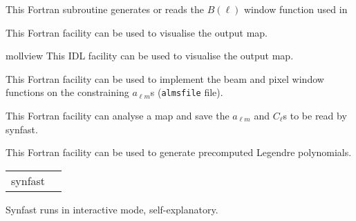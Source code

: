 \begin{support}
  \begin{sulist}{} %
  \item[\htmlref{generate\_beam}{sub:generate_beam}] This \healpix Fortran
subroutine generates or reads the $B(\ell)$ window function used in \thedocid
  \item[\htmlref{map2gif}{fac:map2gif}] This \healpix Fortran facility can be used to visualise the
  output map.
  \item[mollview] This \healpix IDL facility can be used to visualise the
  output map.
  \item[\htmlref{alteralm}{fac:alteralm}] This \healpix Fortran facility can be
  used to implement the beam and pixel window functions on the constraining
  $a_{\ell m}$s ({\tt almsfile} file).
  \item[\htmlref{anafast}{fac:anafast}] This \healpix Fortran facility can analyse a \healpix map and 
     	       save the $a_{\ell m}$ and $C_{\ell}$s to be read by synfast.
  \item[\htmlref{plmgen}{fac:plmgen}] This \healpix Fortran facility can be used to generate precomputed Legendre polynomials.
		
  \end{sulist}
\end{support}

\begin{examples}{1}
{
\begin{tabular}{ll} %
synfast  \\
\end{tabular}
}
{
Synfast runs in interactive mode, self-explanatory.
}
\end{examples}

\vfill\newpage

